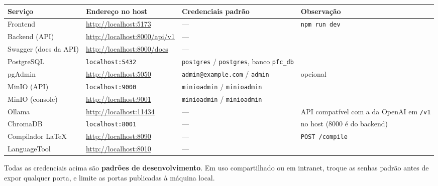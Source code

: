 \documentclass[
  brazilian,
  a4paper,12pt,oneside]{report}
\newcounter{none} %
\begin{document}
{\def\LTcaptype{none} %
\begin{longtable}[]{@{}
  >{\raggedright\arraybackslash}p{}
  >{\raggedright\arraybackslash}p{}
  >{\raggedright\arraybackslash}p{}
  >{\raggedright\arraybackslash}p{}@{}}
\toprule\noalign{}
\begin{minipage}[b]{\linewidth}\raggedright
Serviço
\end{minipage} & \begin{minipage}[b]{\linewidth}\raggedright
Endereço no host
\end{minipage} & \begin{minipage}[b]{\linewidth}\raggedright
Credenciais padrão
\end{minipage} & \begin{minipage}[b]{\linewidth}\raggedright
Observação
\end{minipage} \\
\midrule\noalign{}
\endhead
\bottomrule\noalign{}
\endlastfoot
Frontend & \url{http://localhost:5173} & --- & \texttt{npm\ run\ dev} \\
Backend (API) & \url{http://localhost:8000/api/v1} & --- & \\
Swagger (docs da API) & \url{http://localhost:8000/docs} & --- & \\
PostgreSQL & \texttt{localhost:}\allowbreak{}\texttt{5432} &
\texttt{postgres} / \texttt{postgres}, banco
\texttt{pfc\_}\allowbreak{}\texttt{db} & \\
pgAdmin & \url{http://localhost:5050} &
\texttt{admin@example.}\allowbreak{}\texttt{com} / \texttt{admin} &
opcional \\
MinIO (API) & \texttt{localhost:}\allowbreak{}\texttt{9000} &
\texttt{minioadmin} / \texttt{minioadmin} & \\
MinIO (console) & \url{http://localhost:9001} & \texttt{minioadmin} /
\texttt{minioadmin} & \\
Ollama & \url{http://localhost:11434} & --- & API compatível com a da
OpenAI em \texttt{/}\allowbreak{}\texttt{v1} \\
ChromaDB & \texttt{localhost:}\allowbreak{}\texttt{8001} & --- & 8001 no
host (8000 é do backend) \\
Compilador LaTeX & \url{http://localhost:8090} & --- &
\texttt{POST\ /}\allowbreak{}\texttt{compile} \\
LanguageTool & \url{http://localhost:8010} & --- & \\
\end{longtable}
}

Todas as credenciais acima são \textbf{padrões de desenvolvimento}. Em
uso compartilhado ou em intranet, troque as senhas padrão antes de expor
qualquer porta, e limite as portas publicadas à máquina local.
\end{document}
